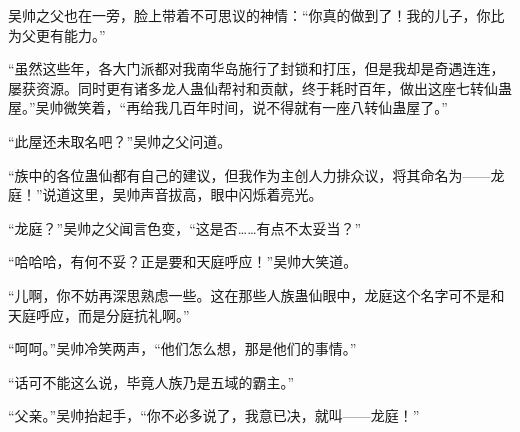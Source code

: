 \begin{this_body}
吴帅之父也在一旁，脸上带着不可思议的神情：“你真的做到了！我的儿子，你比为父更有能力。”

“虽然这些年，各大门派都对我南华岛施行了封锁和打压，但是我却是奇遇连连，屡获资源。同时更有诸多龙人蛊仙帮衬和贡献，终于耗时百年，做出这座七转仙蛊屋。”吴帅微笑着，“再给我几百年时间，说不得就有一座八转仙蛊屋了。”

“此屋还未取名吧？”吴帅之父问道。

“族中的各位蛊仙都有自己的建议，但我作为主创人力排众议，将其命名为——龙庭！”说道这里，吴帅声音拔高，眼中闪烁着亮光。

“龙庭？”吴帅之父闻言色变，“这是否……有点不太妥当？”

“哈哈哈，有何不妥？正是要和天庭呼应！”吴帅大笑道。

“儿啊，你不妨再深思熟虑一些。这在那些人族蛊仙眼中，龙庭这个名字可不是和天庭呼应，而是分庭抗礼啊。”

“呵呵。”吴帅冷笑两声，“他们怎么想，那是他们的事情。”

“话可不能这么说，毕竟人族乃是五域的霸主。”

“父亲。”吴帅抬起手，“你不必多说了，我意已决，就叫——龙庭！”

\end{this_body}

